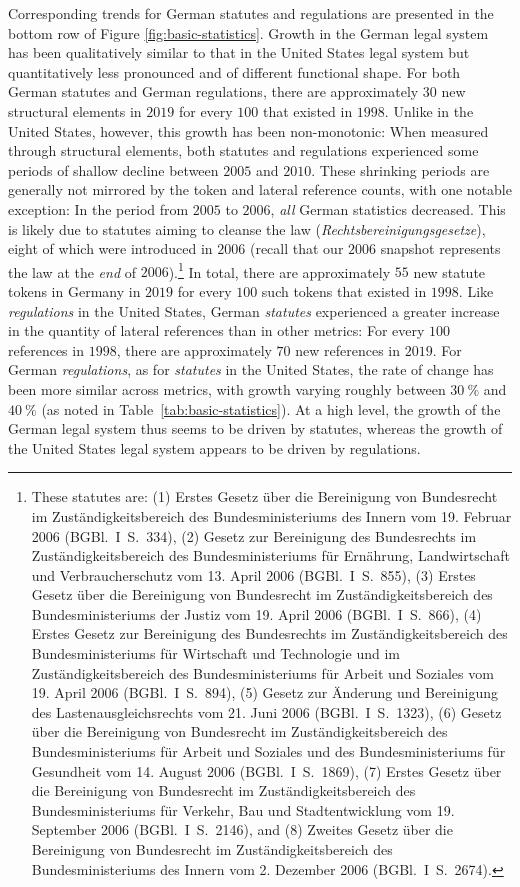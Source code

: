 Corresponding trends for German statutes and regulations are presented in the bottom row of Figure \ref{fig:basic-statistics}.  
Growth in the German legal system has been qualitatively similar to that in the United States legal system but quantitatively less pronounced and of different functional shape. 
For both German statutes and German regulations, there are approximately $30$ new structural elements in $2019$ for every $100$ that existed in $1998$. 
Unlike in the United States, however, this growth has been non-monotonic: 
When measured through structural elements, both statutes and regulations experienced some periods of shallow decline between $2005$ and $2010$.
These shrinking periods are generally not mirrored by the token and lateral reference counts, with one notable exception:
In the period from $2005$ to $2006$, \emph{all} German statistics decreased. 
This is likely due to statutes aiming to cleanse the law (\emph{Rechtsbereinigungsgesetze}), eight of which were introduced in $2006$ (recall that our $2006$ snapshot represents the law at the \emph{end} of $2006$).\footnote{%
These statutes are: 
(1) Erstes Gesetz über die Bereinigung von Bundesrecht im Zuständigkeitsbereich des Bundesministeriums des Innern vom 19. Februar 2006 (BGBl.~I~S.~334),
(2) Gesetz zur Bereinigung des Bundesrechts im Zuständigkeitsbereich des Bundesministeriums für Ernährung, Landwirtschaft und Verbraucherschutz vom 13. April 2006 (BGBl.~I~S.~855),
(3) Erstes Gesetz über die Bereinigung von Bundesrecht im Zuständigkeitsbereich des Bundesministeriums der Justiz vom 19. April 2006 (BGBl.~I~S.~866),
(4) Erstes Gesetz zur Bereinigung des Bundesrechts im Zuständigkeitsbereich des Bundesministeriums für Wirtschaft und Technologie und im Zuständigkeitsbereich des Bundesministeriums für Arbeit und Soziales vom 19. April 2006 (BGBl.~I~S.~894),
(5) Gesetz zur Änderung und Bereinigung des Lastenausgleichsrechts vom 21. Juni 2006 (BGBl.~I~S.~1323),
(6) Gesetz über die Bereinigung von Bundesrecht im Zuständigkeitsbereich des Bundesministeriums für Arbeit und Soziales und des Bundesministeriums für Gesundheit vom 14. August 2006 (BGBl.~I~S.~1869),
(7) Erstes Gesetz über die Bereinigung von Bundesrecht im Zuständigkeitsbereich des Bundesministeriums für Verkehr, Bau und Stadtentwicklung vom 19. September 2006 (BGBl.~I~S.~2146), and
(8) Zweites Gesetz über die Bereinigung von Bundesrecht im Zuständigkeitsbereich des Bundesministeriums des Innern vom 2. Dezember 2006 (BGBl.~I~S.~2674).
}
In total, there are approximately $55$ new statute tokens in Germany in $2019$ for every $100$ such tokens that existed in $1998$. 
Like \emph{regulations} in the United States, German \emph{statutes} experienced a greater increase in the quantity of lateral references than in other metrics: 
For every $100$ references in $1998$, there are approximately $70$ new references in $2019$. 
For German \emph{regulations}, as for \emph{statutes} in the United States, the rate of change has been more similar across metrics, with growth varying roughly between $30~\%$ and $40~\%$ (as noted in Table~\ref{tab:basic-statistics}).
At a high level, the growth of the German legal system thus seems to be driven by statutes, whereas the growth of the United States legal system appears to be driven by regulations.

